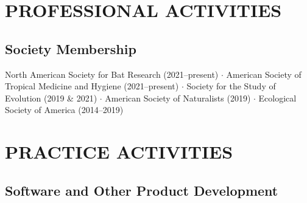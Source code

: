 \documentclass{cv}
\begin{document}



\section*{PROFESSIONAL ACTIVITIES}

\subsection*{Society Membership}

North American Society for Bat Research (2021--present) $\cdot$ American Society of Tropical Medicine and Hygiene (2021--present) $\cdot$ Society for the Study of Evolution (2019 \& 2021) $\cdot$ American Society of Naturalists (2019) $\cdot$ Ecological Society of America (2014--2019)






\section*{PRACTICE ACTIVITIES}

\subsection*{Software and Other Product Development}
\end{document}
